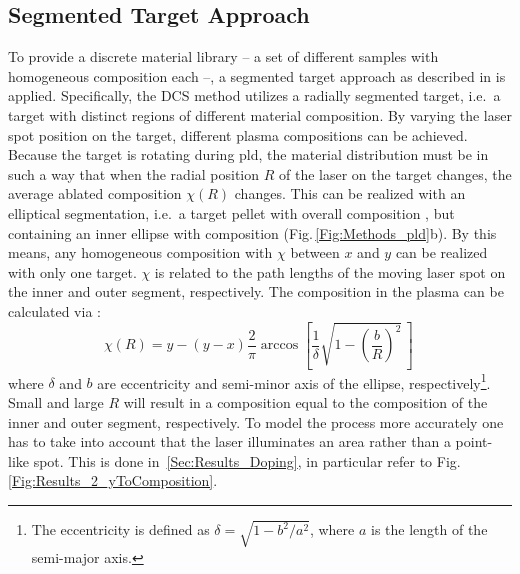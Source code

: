 \subsection{Segmented Target Approach}\label{Sec:Methods_VCCS}
To provide a discrete material library -- a set of different samples with homogeneous composition each --, a segmented target approach as described in \textcite{wenckstern2020} is applied.
Specifically, the \gls{DCS} method utilizes a radially segmented target, i.e.\ a target with distinct regions of different material composition.
By varying the laser spot position on the target, different plasma compositions can be achieved.
Because the target is rotating during \gls{pld}, the material distribution must be in such a way that when the radial position $R$ of the laser on the target changes, the average ablated composition $\chi(R)$ changes.
This can be realized with an elliptical segmentation, i.e.\ a target pellet with overall composition , but containing an inner ellipse with composition  (Fig.\,\ref{Fig:Methods_pld}b).
By this means, any homogeneous composition  with $\chi$ between $x$ and $y$ can be realized with only one target.
$\chi$ is related to the path lengths of the moving laser spot on the inner and outer segment, respectively.
The composition in the plasma can be calculated via \cite{wenckstern2020}:
\begin{equation}\label{Equ:Methods_composition}
    \chi(R) = y-(y-x)\frac{2}{\pi}\arccos\left[\frac{1}{\delta}\sqrt{1-\left(\frac{b}{R}\right)^2}\,\right]\,
\end{equation}
where $\delta$ and $b$ are eccentricity and semi-minor axis of the ellipse, respectively\footnote{
    The eccentricity is defined as $\delta=\sqrt{1-b^2/a^2}$, where $a$ is the length of the semi-major axis.
}.
Small and large $R$ will result in a composition equal to the composition of the inner and outer segment, respectively.
To model the process more accurately one has to take into account that the laser illuminates an area rather than a point-like spot.
This is done in~\ref{Sec:Results_Doping}, in particular refer to Fig.\,\ref{Fig:Results_2_yToComposition}. 